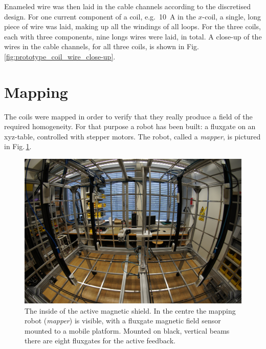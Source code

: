 Enameled wire was then laid in the cable channels according to the discretised design. For one current component of a coil, e.g.\ \SI[detect-all = true]{10}{\ampere} in the $x$-coil, a single, long piece of wire was laid, making up all the windings of all loops. For the three coils, each with three components, nine longs wires were laid, in total.
A close-up of the wires in the cable channels, for all three coils, is shown in Fig.\,\ref{fig:prototype_coil_wire_close-up}.




\section{Mapping}
\label{sec:prototype_mapping}
The coils were mapped in order to verify that they really produce a field of the required homogeneity. For that purpose a robot has been built: a fluxgate on an xyz-table, controlled with stepper motors. The robot, called a \emph{mapper}, is pictured in Fig.\,\ref{fig:prototype_photo_inside}.

\begin{figure}
  \centering
  \includegraphics[width=0.75\linewidth]{gfx/prototype/DSC03476.JPG}
  \caption{The inside of the active magnetic shield. In the centre the mapping robot (\emph{mapper}) is visible, with a fluxgate magnetic field sensor mounted to a mobile platform. Mounted on black, vertical beams there are eight fluxgates for the active feedback.}\label{fig:prototype_photo_inside}
\end{figure}

